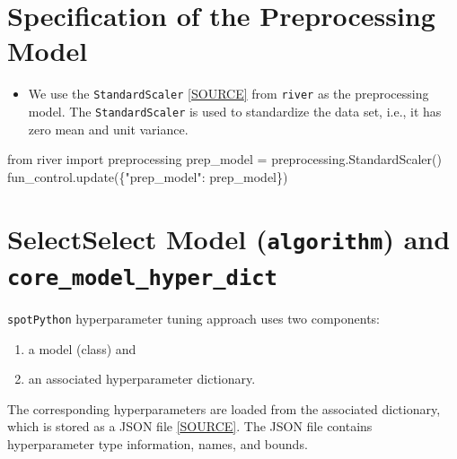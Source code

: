 \documentclass[
  letterpaper,
  DIV=11,
  numbers=noendperiod]{scrreprt}
\newenvironment{Shaded}{\begin{snugshade}}{\end{snugshade}}
\newcommand{\ImportTok}[1]{\textcolor[rgb]{0.00,0.46,0.62}{#1}}
\newcommand{\NormalTok}[1]{\textcolor[rgb]{0.00,0.23,0.31}{#1}}
\newcommand{\OperatorTok}[1]{\textcolor[rgb]{0.37,0.37,0.37}{#1}}
\newcommand{\StringTok}[1]{\textcolor[rgb]{0.13,0.47,0.30}{#1}}
\providecommand{\tightlist}{%
  \setlength{\itemsep}{0pt}\setlength{\parskip}{0pt}}\usepackage{longtable,booktabs,array}
\begin{document}
\hypertarget{specification-of-the-preprocessing-model-1}{%
\section{Specification of the Preprocessing
Model}\label{specification-of-the-preprocessing-model-1}}

\begin{itemize}
\tightlist
\item
  We use the \texttt{StandardScaler}
  \href{https://riverml.xyz/dev/api/preprocessing/StandardScaler/}{{[}SOURCE{]}}
  from \texttt{river} as the preprocessing model. The
  \texttt{StandardScaler} is used to standardize the data set, i.e., it
  has zero mean and unit variance.
\end{itemize}

\begin{Shaded}
\begin{Highlighting}[]
\ImportTok{from}\NormalTok{ river }\ImportTok{import}\NormalTok{ preprocessing}
\NormalTok{prep\_model }\OperatorTok{=}\NormalTok{ preprocessing.StandardScaler()}
\NormalTok{fun\_control.update(\{}\StringTok{"prep\_model"}\NormalTok{: prep\_model\})}
\end{Highlighting}
\end{Shaded}

\hypertarget{selectselect-model-algorithm-and-core_model_hyper_dict-1}{%
\section{\texorpdfstring{SelectSelect Model (\texttt{algorithm}) and
\texttt{core\_model\_hyper\_dict}}{SelectSelect Model (algorithm) and core\_model\_hyper\_dict}}\label{selectselect-model-algorithm-and-core_model_hyper_dict-1}}

\texttt{spotPython} hyperparameter tuning approach uses two components:

\begin{enumerate}
\def\labelenumi{\arabic{enumi}.}
\tightlist
\item
  a model (class) and
\item
  an associated hyperparameter dictionary.
\end{enumerate}

The corresponding hyperparameters are loaded from the associated
dictionary, which is stored as a JSON file
\href{https://github.com/sequential-parameter-optimization/spotRiver/blob/main/src/spotRiver/data/river_hyper_dict.json}{{[}SOURCE{]}}.
The JSON file contains hyperparameter type information, names, and
bounds.
\end{document}
